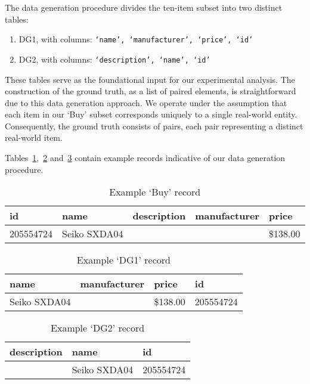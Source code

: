 The data generation procedure divides the ten-item subset into two distinct
tables:

\begin{enumerate}[label=\textbullet,leftmargin=1cm]
    \item DG1, with columns: \texttt{`name', `manufacturer', `price', `id'}
    \item DG2, with columns: \texttt{`description', `name', `id'}
\end{enumerate}

These tables serve as the foundational input for our experimental analysis.
The construction of the ground truth, as a list of paired elements, is
straightforward due to this data generation approach.
We operate under the assumption that each item in our `Buy' subset
corresponds uniquely to a single real-world entity.
Consequently, the ground truth consists of pairs, each pair representing a
distinct real-world item.

Tables~\ref{tab:buy-record},~\ref{tab:dg1-record} and~\ref{tab:dg2-record} contain example
records indicative of our data generation procedure.

\begin{table}[ht]
    \setlength\tabcolsep{6pt}
    \centering
    \begin{tabular}{lllll}
        \toprule
        id        & name         & description & manufacturer & price    \\
        \midrule
        205554724 & Seiko SXDA04 &             &              & \$138.00 \\
        \bottomrule
    \end{tabular}
    \caption{Example `Buy' record}\label{tab:buy-record}
\end{table}

\begin{table}[ht]
    \setlength\tabcolsep{12pt}
    \centering
    \begin{tabular}{llll}
        \toprule
        name         & manufacturer & price    & id        \\
        \midrule
        Seiko SXDA04 &              & \$138.00 & 205554724 \\
        \bottomrule
    \end{tabular}
    \caption{Example `DG1' record}\label{tab:dg1-record}
\end{table}

\begin{table}[ht]
    \setlength\tabcolsep{12pt}
    \centering
    \begin{tabular}[b]{lll}
        \toprule
        description & name         & id        \\
        \midrule
                    & Seiko SXDA04 & 205554724 \\
        \bottomrule
    \end{tabular}
    \caption{Example `DG2' record}\label{tab:dg2-record}
\end{table}

